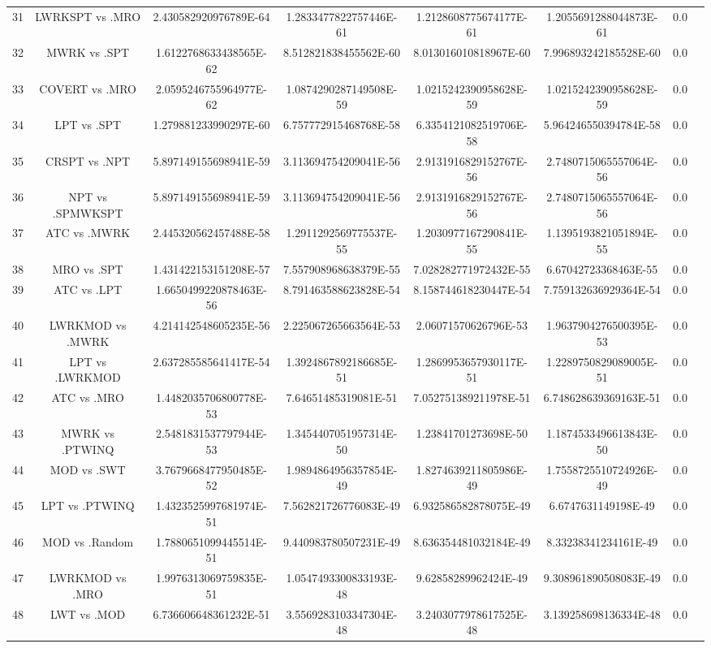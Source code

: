 \documentclass[a3paper,10pt]{article}
\begin{document}
\begin{table}[!htp]
\begin{tabular}{cccccccc}
31&LWRKSPT vs .MRO&2.430582920976789E-64&1.2833477822757446E-61&1.2128608775674177E-61&1.2055691288044873E-61&0.0\\
32&MWRK vs .SPT&1.6122768633438565E-62&8.512821838455562E-60&8.013016010818967E-60&7.996893242185528E-60&0.0\\
33&COVERT vs .MRO&2.0595246755964977E-62&1.0874290287149508E-59&1.0215242390958628E-59&1.0215242390958628E-59&0.0\\
34&LPT vs .SPT&1.279881233990297E-60&6.757772915468768E-58&6.3354121082519706E-58&5.964246550394784E-58&0.0\\
35&CRSPT vs .NPT&5.897149155698941E-59&3.113694754209041E-56&2.9131916829152767E-56&2.7480715065557064E-56&0.0\\
36&NPT vs .SPMWKSPT&5.897149155698941E-59&3.113694754209041E-56&2.9131916829152767E-56&2.7480715065557064E-56&0.0\\
37&ATC vs .MWRK&2.445320562457488E-58&1.2911292569775537E-55&1.2030977167290841E-55&1.1395193821051894E-55&0.0\\
38&MRO vs .SPT&1.431422153151208E-57&7.557908968638379E-55&7.028282771972432E-55&6.67042723368463E-55&0.0\\
39&ATC vs .LPT&1.6650499220878463E-56&8.791463588623828E-54&8.158744618230447E-54&7.759132636929364E-54&0.0\\
40&LWRKMOD vs .MWRK&4.214142548605235E-56&2.225067265663564E-53&2.06071570626796E-53&1.9637904276500395E-53&0.0\\
41&LPT vs .LWRKMOD&2.637285585641417E-54&1.3924867892186685E-51&1.2869953657930117E-51&1.2289750829089005E-51&0.0\\
42&ATC vs .MRO&1.4482035706800778E-53&7.64651485319081E-51&7.052751389211978E-51&6.748628639369163E-51&0.0\\
43&MWRK vs .PTWINQ&2.5481831537797944E-53&1.3454407051957314E-50&1.23841701273698E-50&1.1874533496613843E-50&0.0\\
44&MOD vs .SWT&3.7679668477950485E-52&1.9894864956357854E-49&1.8274639211805986E-49&1.7558725510724926E-49&0.0\\
45&LPT vs .PTWINQ&1.4323525997681974E-51&7.562821726776083E-49&6.932586582878075E-49&6.6747631149198E-49&0.0\\
46&MOD vs .Random&1.7880651099445514E-51&9.440983780507231E-49&8.636354481032184E-49&8.33238341234161E-49&0.0\\
47&LWRKMOD vs .MRO&1.9976313069759835E-51&1.0547493300833193E-48&9.62858289962424E-49&9.308961890508083E-49&0.0\\
48&LWT vs .MOD&6.736606648361232E-51&3.5569283103347304E-48&3.2403077978617525E-48&3.139258698136334E-48&0.0\\

\end{tabular}
\end{table}
\end{document}
